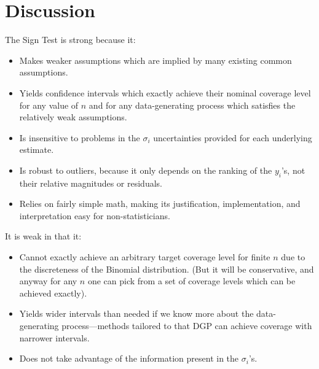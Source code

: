 \documentclass[12pt]{article}
\begin{document}
\section{Discussion}\label{discussion-2}

The Sign Test is strong because it:

\begin{itemize}
\item
  Makes weaker assumptions which are implied by many existing common assumptions.
\item
  Yields confidence intervals which exactly achieve their nominal coverage level for any value of $n$ and for any data-generating process which satisfies the relatively weak assumptions.
\item
  Is insensitive to problems in the $\sigma_i$ uncertainties provided for each underlying estimate.
\item
  Is robust to outliers, because it only depends on the ranking of the $y_i$'s, not their relative magnitudes or residuals.
\item
  Relies on fairly simple math, making its justification, implementation, and interpretation easy for non-statisticians.
\end{itemize}

It is weak in that it:

\begin{itemize}
\item
  Cannot exactly achieve an arbitrary target coverage level for finite $n$ due to the discreteness of the Binomial distribution. (But it will be conservative, and anyway for any $n$ one can pick from a set of coverage levels which can be achieved exactly).
\item
  Yields wider intervals than needed if we know more about the data-generating process---methods tailored to that DGP can achieve coverage with narrower intervals.
\item
  Does not take advantage of the information present in the $\sigma_i$'s.
\end{itemize}


\end{document}
